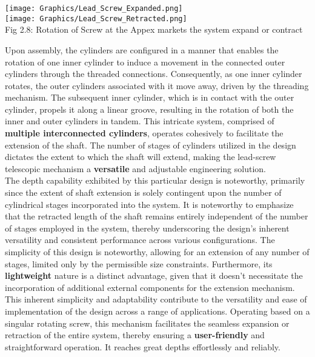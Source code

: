 \documentclass[a4,10pt]{report}
\begin{document}
\begin{center}
    \texttt{[image: Graphics/Lead\_Screw\_Expanded.png]} \\
    \texttt{[image: Graphics/Lead\_Screw\_Retracted.png]} \\
    \normalsize{Fig 2.8: Rotation of Screw at the Appex markets the system expand or contract}
\end{center}
Upon assembly, the cylinders are configured in a manner that enables the rotation of one inner cylinder to induce a movement in the connected outer cylinders through the threaded connections. Consequently, as one inner cylinder rotates, the outer cylinders associated with it move away, driven by the threading mechanism. The subsequent inner cylinder, which is in contact with the outer cylinder, propels it along a linear groove, resulting in the rotation of both the inner and outer cylinders in tandem. This intricate system, comprised of \textbf{multiple interconnected cylinders}, operates cohesively to facilitate the extension of the shaft. The number of stages of cylinders utilized in the design dictates the extent to which the shaft will extend, making the lead-screw telescopic mechanism a \textbf{versatile} and adjustable engineering solution. 
\vspace{2mm} \\
The depth capability exhibited by this particular design is noteworthy, primarily since the extent of shaft extension is solely contingent upon the number of cylindrical stages incorporated into the system. It is noteworthy to emphasize that the retracted length of the shaft remains entirely independent of the number of stages employed in the system, thereby underscoring the design's inherent versatility and consistent performance across various configurations. The simplicity of this design is noteworthy, allowing for an extension of any number of stages, limited only by the permissible size constraints. Furthermore, its \textbf{lightweight} nature is a distinct advantage, given that it doesn't necessitate the incorporation of additional external components for the extension mechanism. This inherent simplicity and adaptability contribute to the versatility and ease of implementation of the design across a range of applications. Operating based on a singular rotating screw, this mechanism facilitates the seamless expansion or retraction of the entire system, thereby ensuring a \textbf{user-friendly} and straightforward operation. It reaches great depths effortlessly and reliably. 
\vspace{2mm} \\
\end{document}
